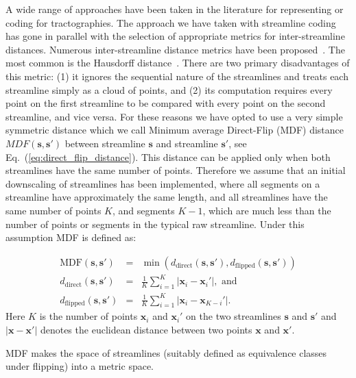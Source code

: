 \documentclass{bioinfo}
\begin{document}
\begin{methods}
A wide range of approaches have been taken in the literature for
representing or coding for tractographies. The approach we have taken
with streamline coding has gone in parallel with the selection of
appropriate metrics for inter-streamline distances.  Numerous
inter-streamline distance metrics have been proposed~\citep{Ding2003,
  MaddahIPMI2007, zhang2005dti}. The most common is the Hausdorff
distance~\citep[and many other studies]{corouge2004towards}. There are
two primary disadvantages of this metric: (1) it ignores the sequential
nature of the streamlines and treats each streamline simply as a cloud
of points, and (2) its computation requires every point on the first
streamline to be compared with every point on the second streamline, and
vice versa. For these reasons we have opted to use a very simple
symmetric distance \citep{EGMB10, Visser2010} which we call Minimum
average Direct-Flip (MDF) distance $MDF(\mathbf{s},\mathbf{s'})$ between
streamline $\mathbf{s}$ and streamline $\mathbf{s'}$, see
Eq.~(\ref{eq:direct_flip_distance}). This distance can be applied only
when both streamlines have the same number of points. Therefore we
assume that an initial downscaling of streamlines has been implemented,
where all segments on a streamline have approximately the same length,
and all streamlines have the same number of points $K$, and segments
$K-1$, which are much less than the number of points or segments in the
typical raw streamline.  Under this assumption MDF is defined as:

\begin{eqnarray}
\textrm{MDF}(\mathbf{s},\mathbf{s'}) & = & \min(d_{\textrm{direct}}(\mathbf{s},\mathbf{s'}),d_{\textrm{flipped}}(\mathbf{s},\mathbf{s'}))\label{eq:direct_flip_distance}\\
d_{\textrm{direct}}(\mathbf{s},\mathbf{s'}) & = & \frac{1}{K}\sum_{i=1}^{K}|\mathbf{x}_{i}-\mathbf{x}_{i}'|,\,\,\textrm{and}\nonumber\\
d_{\textrm{flipped}}(\mathbf{s},\mathbf{s'}) & = & \frac{1}{K}\sum_{i=1}^{K}|\mathbf{x}_{i}-\mathbf{x}_{K-i}'|.\nonumber
\end{eqnarray}
\noindent
Here $K$ is the number of points $\mathbf{x}_{i}$ and $\mathbf{x}_{i}'$ on the two streamlines $\mathbf{s}$ and $\mathbf{s'}$
and $|\mathbf{x}-\mathbf{x'}|$ denotes the euclidean distance between two points $\mathbf{x}$ and
$\mathbf{x'}$.

MDF makes the space of streamlines (suitably defined as equivalence
classes under flipping) into a metric space.


\end{methods}
\end{document}
